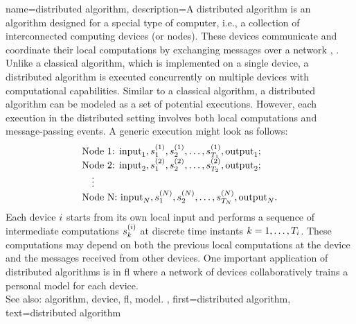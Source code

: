 {name={distributed algorithm},
	description={A distributed \gls{algorithm} is an \gls{algorithm} designed for 
		a special type of computer, i.e., a collection of interconnected computing devices (or nodes). 
		These devices communicate and coordinate their local computations by exchanging 
		messages over a network \cite{IntroDistAlg}, \cite{ParallelDistrBook}. Unlike a classical \gls{algorithm}, 
		which is implemented on a single \gls{device}, a distributed \gls{algorithm} is 
		executed concurrently on multiple \glspl{device} with computational capabilities. 
		Similar to a classical \gls{algorithm}, a distributed \gls{algorithm} can be modeled as a 
		set of potential executions. However, each execution in the distributed setting involves 
		both local computations and message-passing events. A generic execution might look as 
		follows:
		\[
		\begin{array}{l}
			\text{Node 1: } {\rm input}_1, s_1^{(1)}, s_2^{(1)}, \ldots, s_{T_1}^{(1)}, {\rm output}_1; \\
			\text{Node 2: } {\rm input}_2, s_1^{(2)}, s_2^{(2)}, \ldots, s_{T_2}^{(2)}, {\rm output}_2; \\
			\quad \vdots \\
			\text{Node N: } {\rm input}_N, s_1^{(N)}, s_2^{(N)}, \ldots, s_{T_N}^{(N)}, {\rm output}_N.
		\end{array}
		\]
		Each \gls{device} $i$ starts from its own local input and performs a sequence of 
		intermediate computations $s_{k}^{(i)}$ at discrete time instants $k = 1, \dots, T_i$. 
		These computations may depend on both the previous local computations at the \gls{device} 
		and the messages received from other \glspl{device}. One important application of distributed 
		\glspl{algorithm} is in \gls{fl} where a network of \glspl{device} collaboratively trains a personal \gls{model} 
		for each \gls{device}. 
					\\ 
		See also: \gls{algorithm}, \gls{device}, \gls{fl}, \gls{model}.
		},
	first={distributed algorithm}, 
	text={distributed algorithm}
}


